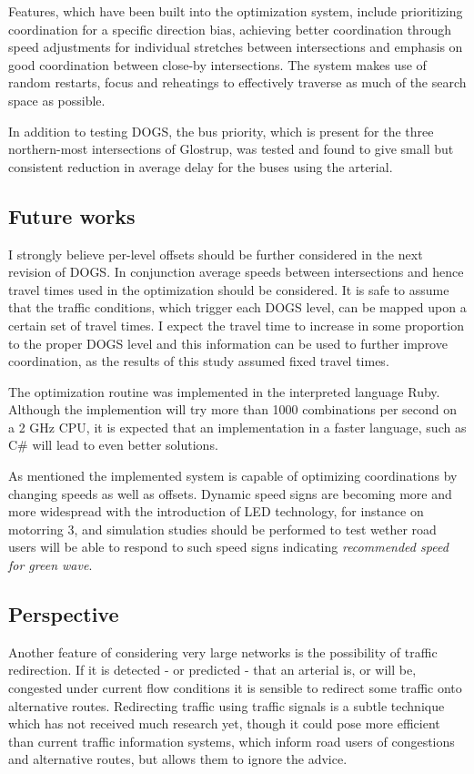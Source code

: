Features, which have been built into the optimization system, include prioritizing coordination for a specific direction bias, achieving better coordination through speed adjustments for individual stretches between intersections and emphasis on good coordination between close-by intersections. The system makes use of random restarts, focus and reheatings to effectively traverse as much of the search space as possible.

In addition to testing DOGS, the bus priority, which is present for the three northern-most intersections of Glostrup, was tested and found to give small but consistent reduction in average delay for the buses using the arterial.

\subsection{Future works}
I strongly believe per-level offsets should be further considered in the next revision of DOGS. In conjunction average speeds between intersections and hence travel times used in the optimization should be considered. It is safe to assume that the traffic conditions, which trigger each DOGS level, can be mapped upon a certain set of travel times. I expect the travel time to increase in some proportion to the proper DOGS level and this information can be used to further improve coordination, as the results of this study assumed fixed travel times.

The optimization routine was implemented in the interpreted language Ruby. Although the implemention will try more than 1000 combinations per second on a 2 GHz CPU, it is expected that an implementation in a faster language, such as C\# will lead to even better solutions.

As mentioned the implemented system is capable of optimizing coordinations by changing speeds as well as offsets. Dynamic speed signs are becoming more and more widespread with the introduction of LED technology, for instance on motorring 3, and simulation studies should be performed to test wether road users will be able to respond to such speed signs indicating \textit{recommended speed for green wave}.

\subsection{Perspective}
Another feature of considering very large networks is the possibility of traffic redirection. If it is detected - or predicted - that an arterial is, or will be, congested under current flow conditions it is sensible to redirect some traffic onto alternative routes. 
Redirecting traffic using traffic signals is a subtle technique which has not received much research yet, though it could pose more efficient than current traffic information systems, which inform road users of congestions and alternative routes, but allows them to ignore the advice.
